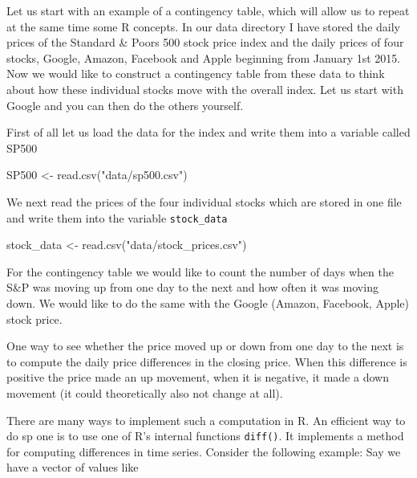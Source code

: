 \documentclass[
]{book}
\newenvironment{Shaded}{\begin{snugshade}}{\end{snugshade}}
\newcommand{\FunctionTok}[1]{\textcolor[rgb]{0.00,0.00,0.00}{#1}}
\newcommand{\NormalTok}[1]{#1}
\newcommand{\OtherTok}[1]{\textcolor[rgb]{0.56,0.35,0.01}{#1}}
\newcommand{\StringTok}[1]{\textcolor[rgb]{0.31,0.60,0.02}{#1}}
\begin{document}
Let us start with an example of a contingency table, which will allow us to repeat at the
same time some R concepts. In our data directory I have stored
the daily prices of the Standard \& Poors 500 stock price index and the daily prices
of four stocks, Google, Amazon, Facebook and Apple beginning from January 1st 2015.
Now we would like to construct
a contingency table from these data to think about how these individual stocks
move with the overall index. Let us start with Google and you can then do the others
yourself.

First of all let us load the data for the index and write them into a variable called SP500

\begin{Shaded}
\begin{Highlighting}[]
\NormalTok{SP500 }\OtherTok{\textless{}{-}} \FunctionTok{read.csv}\NormalTok{(}\StringTok{"data/sp500.csv"}\NormalTok{)}
\end{Highlighting}
\end{Shaded}

We next read the prices of the four individual stocks which are stored in
one file and write them into the variable \texttt{stock\_data}

\begin{Shaded}
\begin{Highlighting}[]
\NormalTok{stock\_data }\OtherTok{\textless{}{-}} \FunctionTok{read.csv}\NormalTok{(}\StringTok{"data/stock\_prices.csv"}\NormalTok{)}
\end{Highlighting}
\end{Shaded}

For the contingency table we would like to count the number of days when the
S\&P was moving up from one day to the next and how often it was moving down. We would
like to do the same with the Google (Amazon, Facebook, Apple) stock price.

One way to see whether the price moved up or down from one day to the next is to
compute the daily price differences in the closing price. When this difference is
positive the price made an up movement, when it is negative, it made a down movement (it
could theoretically also not change at all).

There are many ways to implement such a computation in R. An efficient way to do sp one is to use
one of R's internal functions \texttt{diff()}. It implements a method for
computing differences in time series. Consider the following example: Say we have
a vector of values like
\end{document}
